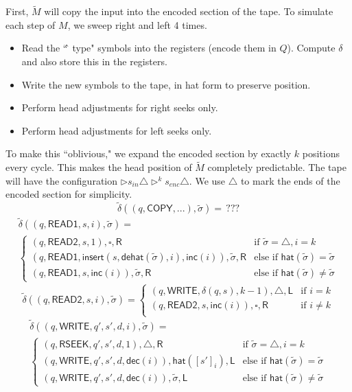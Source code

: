 \documentclass[12pt]{article}
\begin{document}
First, $\tilde{M}$ will copy the input into the encoded section of the tape. To simulate each step of $M$, we sweep right and left 4 times.
\begin{itemize}
\item{Read the ``\^\, type" symbols into the registers (encode them in $Q$). Compute $\delta$ and also store this in the registers.}
\item{Write the new symbols to the tape, in hat form to preserve position.}
\item{Perform head adjustments for right seeks only.}
\item{Perform head adjustments for left seeks only.}
\end{itemize}
To make this ``oblivious," we expand the encoded section by exactly $k$ positions every cycle. This makes the head position of $\tilde{M}$ completely predictable. The tape will have the configuration $\triangleright s_{in} \triangle \triangleright^k s_{enc} \triangle$. We use $\triangle$ to mark the ends of the encoded section for simplicity.
$$
\tilde{\delta}((q, \textsf{COPY}, ...), \tilde{\sigma}) = \,???
$$
\begin{multline*}
\tilde{\delta}((q, \textsf{READ1}, s, i), \tilde{\sigma}) = \\
\begin{cases}
(q, \textsf{READ2}, s, 1), \square, \textsf{R} & \text{if } \tilde{\sigma} = \triangle, i = k \\
(q, \textsf{READ1}, \textsf{insert}(s,\textsf{dehat}(\tilde{\sigma}),i), \textsf{inc}(i)), \tilde{\sigma}, \textsf{R} & \text{else if } \textsf{hat}(\tilde{\sigma}) = \tilde{\sigma} \\
(q, \textsf{READ1}, s, \textsf{inc}(i)), \tilde{\sigma}, \textsf{R} & \text{else if } \textsf{hat}(\tilde{\sigma}) \neq \tilde{\sigma}
\end{cases}
\end{multline*}
$$
\tilde{\delta}((q, \textsf{READ2}, s, i), \tilde{\sigma}) =
\begin{cases}
(q, \textsf{WRITE}, \delta(q, s), k-1), \triangle, \textsf{L} & \text{if } i = k \\
(q, \textsf{READ2}, s, \textsf{inc}(i)), \square, \textsf{R} & \text{if } i \neq k \\
\end{cases}
$$
\begin{multline*}
\tilde{\delta}((q, \textsf{WRITE}, q', s', d, i), \tilde{\sigma}) = \\
\begin{cases}
(q, \textsf{RSEEK}, q', s', d, 1), \triangle, \textsf{R} & \text{if } \tilde{\sigma} = \triangle, i = k \\
(q, \textsf{WRITE}, q', s', d, \textsf{dec}(i)), \textsf{hat}([s']_i), \textsf{L} & \text{else if } \textsf{hat}(\tilde{\sigma}) = \tilde{\sigma} \\
(q, \textsf{WRITE}, q', s', d, \textsf{dec}(i)), \tilde{\sigma}, \textsf{L} & \text{else if } \textsf{hat}(\tilde{\sigma}) \neq \tilde{\sigma}
\end{cases}
\end{multline*}
\end{document}
